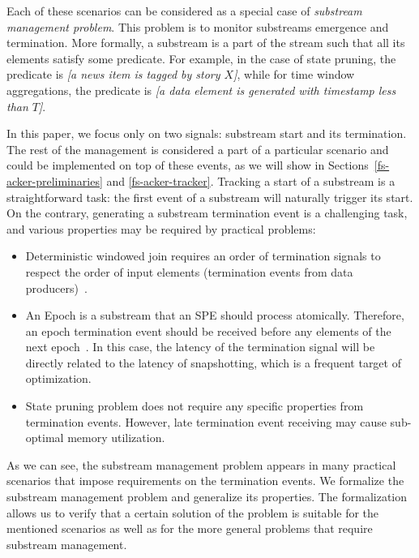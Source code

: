 Each of these scenarios can be considered as a special case of {\em substream management problem}. This problem is to monitor substreams emergence and termination. More formally, a substream is a part of the stream such that all its elements satisfy some predicate. For example, in the case of state pruning, the predicate is {\em [a news item is tagged by story $X$]}, while for time window aggregations, the predicate is {\em [a data element is generated with timestamp less than $T$]}. 

In this paper, we focus only on two signals: substream start and its termination. The rest of the management is considered a part of a particular scenario and could be implemented on top of these events, as we will show in Sections~\ref{fs-acker-preliminaries} and \ref{fs-acker-tracker}. Tracking a start of a substream is a straightforward task: the first event of a substream will naturally trigger its start. On the contrary, generating a substream termination event is a challenging task, and various properties may be required by practical problems:
\begin{itemize}
    \item Deterministic windowed join requires an order of termination signals to respect the order of input elements (termination events from data producers)~\cite{najdataei2019stretch, gulisano2016scalejoin}.
    \item An Epoch is a substream that an SPE should process atomically. Therefore, an epoch termination event should be received before any elements of the next epoch~\cite{2015arXiv150608603C}. In this case, the latency of the termination signal will be directly related to the latency of snapshotting, which is a frequent target of optimization.
    \item State pruning problem does not require any specific properties from termination events. However, late termination event receiving may cause sub-optimal memory utilization.
\end{itemize}

As we can see, the substream management problem appears in many practical scenarios that impose requirements on the termination events. We formalize the substream management problem and generalize its properties. The formalization allows us to verify that a certain solution of the problem is suitable for the mentioned scenarios as well as for the more general problems that require substream management.

